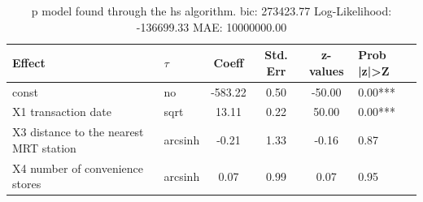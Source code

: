 \begin{table}
	\caption{p model found through the hs algorithm. bic: 273423.77 Log-Likelihood: -136699.33 MAE: 10000000.00}
	\begin{center}
		\begin{tabular}{|l|l|c|c|c|l|}
			\hline
			Effect & $\tau$ & Coeff & Std. Err & z-values & Prob |z|>Z \\
			\hline
			const & no & -583.22 & 0.50 & -50.00 & 0.00*** \\
			\hline
			X1 transaction date & sqrt & 13.11 & 0.22 & 50.00 & 0.00*** \\
			\hline
			X3 distance to the nearest MRT station & arcsinh & -0.21 & 1.33 & -0.16 & 0.87 \\
			\hline
			X4 number of convenience stores & arcsinh & 0.07 & 0.99 & 0.07 & 0.95 \\
			\hline
		\end{tabular}
	\end{center}
\end{table}